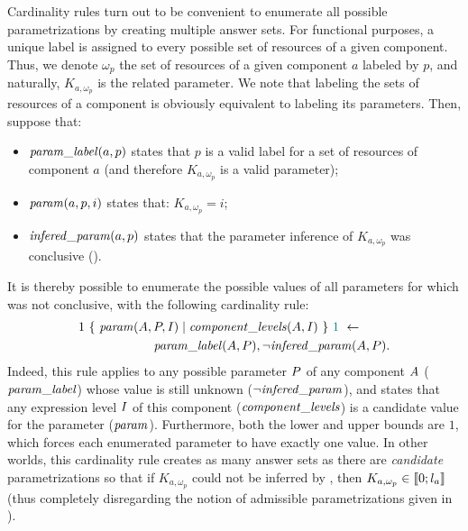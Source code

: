 Cardinality rules turn out to be convenient to enumerate all possible parametrizations by creating multiple answer sets.
For functional purposes, a unique label is assigned to every possible set of resources of a given component.
Thus, we denote $\omega_p$ the set of resources of a given component $a$ labeled by $p$,
and naturally, $K_{a,\omega_p}$ is the related parameter.
We note that labeling the sets of resources of a component is obviously equivalent to labeling its parameters.
Then, suppose that:
\begin{itemize}
  \item $\mathit{param\_label}(a, p)$ states that $p$ is a valid label for a set of resources of component $a$ (and therefore $K_{a,\omega_p}$ is a valid parameter);
  \item $\mathit{param}(a, p, i)$ states that: $K_{a, \omega_p} = i$;
  \item $\mathit{infered\_param}(a, p)$ states that the parameter inference of $K_{a, \omega_p}$ was conclusive ().
\end{itemize}
It is thereby possible to enumerate the possible values of all parameters for which  was not conclusive, with the following cardinality rule:
\begin{align*}
  & 1\ \{\ \mathit{param}(A, P, I) \mid \mathit{component\_levels}(A, I)\ \}\ \textcolor{teal}{1}\ \leftarrow \\
  & \qquad\qquad\qquad \mathit{param\_label}(A, P), \neg \mathit{infered\_param}(A, P).
\end{align*}
Indeed, this rule applies to any possible parameter $P$ of any component $A$ ($\mathit{param\_label}$) whose value is still unknown ($\neg \mathit{infered\_param}$),
and states that any expression level $I$ of this component ($\mathit{component\_levels}$)
is a candidate value for the parameter ($\mathit{param}$).
Furthermore, both the lower and upper bounds are $1$,
which forces each enumerated parameter to have exactly one value.
In other worlds, this cardinality rule creates as many answer sets as there are \emph{candidate} parametrizations
so that if $K_{a, \omega_p}$ could not be inferred by , then
$K_{a, \omega_p} \in \llbracket 0 ; l_a \rrbracket$
(thus completely disregarding the notion of admissible parametrizations given in ).



